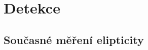 \section{Detekce}
\label{chap:detekce}

\subsection{Současné měření elipticity}
\label{chap:elipticita}

